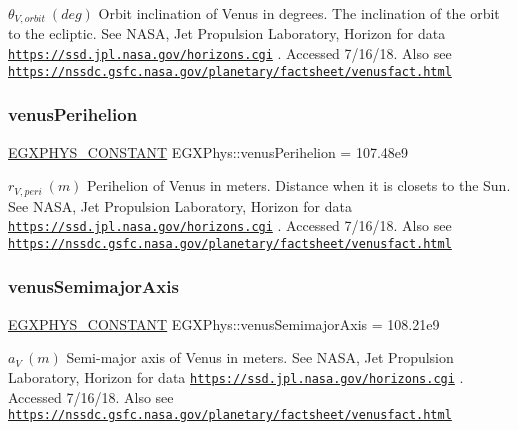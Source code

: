$ \theta_{V,orbit} \ (deg)$ Orbit inclination of Venus in degrees. The inclination of the orbit to the ecliptic. See N\+A\+SA, Jet Propulsion Laboratory, Horizon for data \href{https://ssd.jpl.nasa.gov/horizons.cgi}{\tt https\+://ssd.\+jpl.\+nasa.\+gov/horizons.\+cgi} . Accessed 7/16/18. Also see \href{https://nssdc.gsfc.nasa.gov/planetary/factsheet/venusfact.html}{\tt https\+://nssdc.\+gsfc.\+nasa.\+gov/planetary/factsheet/venusfact.\+html} \mbox{\label{group___e_g_x_phys-_constants-_astrophysics-_solar_system-_venus-_orbit_ga667ee7c48f891d77e7ae9358e144e03e}} 
\subsubsection{\texorpdfstring{venus\+Perihelion}{venusPerihelion}}
{\footnotesize\ttfamily \mbox{\hyperlink{group___e_g_x_phys-_constants-_macros_ga76980d288494ce1714c9ac68a95ba702}{E\+G\+X\+P\+H\+Y\+S\+\_\+\+C\+O\+N\+S\+T\+A\+NT}} E\+G\+X\+Phys\+::venus\+Perihelion = 107.\+48e9}

$ r_{V,peri} \ (m)$ Perihelion of Venus in meters. Distance when it is closets to the Sun. See N\+A\+SA, Jet Propulsion Laboratory, Horizon for data \href{https://ssd.jpl.nasa.gov/horizons.cgi}{\tt https\+://ssd.\+jpl.\+nasa.\+gov/horizons.\+cgi} . Accessed 7/16/18. Also see \href{https://nssdc.gsfc.nasa.gov/planetary/factsheet/venusfact.html}{\tt https\+://nssdc.\+gsfc.\+nasa.\+gov/planetary/factsheet/venusfact.\+html} \mbox{\label{group___e_g_x_phys-_constants-_astrophysics-_solar_system-_venus-_orbit_ga48e1be71e507fa06dfe2887d45c7ca58}} 
\subsubsection{\texorpdfstring{venus\+Semimajor\+Axis}{venusSemimajorAxis}}
{\footnotesize\ttfamily \mbox{\hyperlink{group___e_g_x_phys-_constants-_macros_ga76980d288494ce1714c9ac68a95ba702}{E\+G\+X\+P\+H\+Y\+S\+\_\+\+C\+O\+N\+S\+T\+A\+NT}} E\+G\+X\+Phys\+::venus\+Semimajor\+Axis = 108.\+21e9}

$ a_{V} \ (m)$ Semi-\/major axis of Venus in meters. See N\+A\+SA, Jet Propulsion Laboratory, Horizon for data \href{https://ssd.jpl.nasa.gov/horizons.cgi}{\tt https\+://ssd.\+jpl.\+nasa.\+gov/horizons.\+cgi} . Accessed 7/16/18. Also see \href{https://nssdc.gsfc.nasa.gov/planetary/factsheet/venusfact.html}{\tt https\+://nssdc.\+gsfc.\+nasa.\+gov/planetary/factsheet/venusfact.\+html} \mbox{\label{group___e_g_x_phys-_constants-_astrophysics-_solar_system-_venus-_orbit_ga1b748828465db4be1c9abcd05c13c3df}} 
